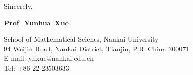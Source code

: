 \documentclass{article}
\begin{document}
\bigskip

Sincerely,
\vspace{30pt}

\textbf{Prof. Yunhua~Xue}\\
\vspace{20pt}

{\footnotesize School of Mathematical Scienes, Nankai University}\\
{\footnotesize 94 Weijin Road, Nankai District, Tianjin, P.R. China 300071}\\
{\small E-mail: yhxue@nankai.edu.cn}\\
{\small Tel: +86 22-23503633}



\end{document}
